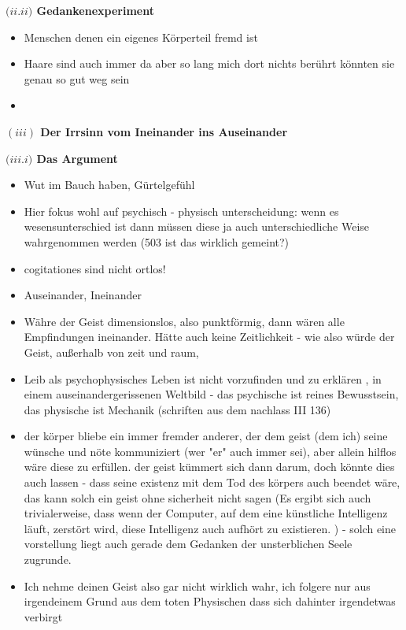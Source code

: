 \documentclass[a4paper, 12pt]{article}
\begin{document}
\begin{onehalfspace}
\vspace{3mm}
\noindent\textbf{$(ii.$\footnotesize$ii$\normalsize$)$ Gedankenexperiment}

\begin{itemize}
  \item Menschen denen ein eigenes Körperteil fremd ist
  \item Haare sind auch immer da aber so lang mich dort nichts berührt könnten sie genau so gut weg sein
  \item 
\end{itemize}


\vspace{5mm}
\noindent\textbf{$(iii)$ Der Irrsinn vom Ineinander ins Auseinander}

\vspace{3mm}
\noindent\textbf{$(iii.$\footnotesize$i$\normalsize$)$ Das Argument}

\begin{itemize}
  \item Wut im Bauch haben, Gürtelgefühl
  \item Hier fokus wohl auf psychisch - physisch unterscheidung: wenn es wesensunterschied ist dann müssen diese ja auch unterschiedliche Weise wahrgenommen werden (503 ist das wirklich gemeint?)
  \item cogitationes sind nicht ortlos!
  \item Auseinander, Ineinander
  \item Währe der Geist dimensionslos, also punktförmig, dann wären alle Empfindungen ineinander. Hätte auch keine Zeitlichkeit - wie also würde der Geist, außerhalb von zeit und raum, 
  \item Leib als psychophysisches Leben ist nicht vorzufinden und zu erklären , in einem auseinandergerissenen Weltbild - das psychische ist reines Bewusstsein, das physische ist Mechanik (schriften aus dem nachlass III 136)
  \item der körper bliebe ein immer fremder anderer, der dem geist (dem ich) seine wünsche und nöte kommuniziert (wer "er" auch immer sei), aber allein hilflos wäre diese zu erfüllen. der geist kümmert sich dann darum, doch könnte dies auch lassen - dass seine existenz mit dem Tod des körpers auch beendet wäre, das kann solch ein geist ohne sicherheit nicht sagen (Es ergibt sich auch trivialerweise, dass wenn der Computer, auf dem eine künstliche Intelligenz läuft, zerstört wird, diese Intelligenz auch aufhört zu existieren. ) - solch eine vorstellung liegt auch gerade dem Gedanken der unsterblichen Seele zugrunde. 
  \item Ich nehme deinen Geist also gar nicht wirklich wahr, ich folgere nur aus irgendeinem Grund aus dem toten Physischen dass sich dahinter irgendetwas verbirgt
\end{itemize}


\end{onehalfspace}
\end{document}
